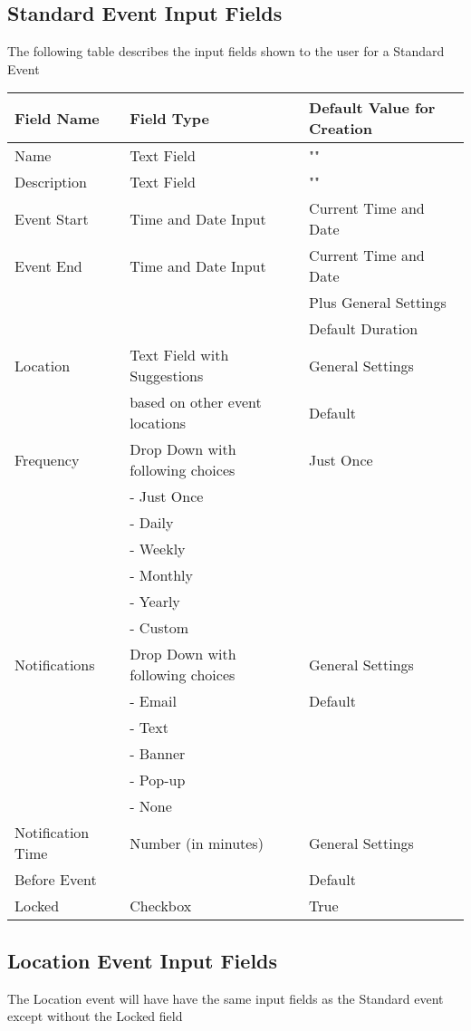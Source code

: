 \documentclass{scrreprt}
\begin{document}
\subsection{Standard Event Input Fields}
The following table describes the input fields shown to the user for a Standard Event
\begin{center}
\begin{longtable}{ | p{3cm} | p{8cm} | p{4cm} | }
\hline
\textbf{Field Name} & \textbf{Field Type} & \textbf{Default Value for Creation} \\
\hline
Name & Text Field & "" \\
\hline
Description & Text Field & "" \\
\hline
Event Start & Time and Date Input & Current Time and Date \\
\hline
Event End & Time and Date Input & Current Time and Date \\
& & Plus General Settings \\
& & Default Duration \\
\hline
Location & Text Field with Suggestions & General Settings \\
& based on other event locations & Default \\
\hline
Frequency & Drop Down with following choices & Just Once \\
& - Just Once & \\
& - Daily & \\
& - Weekly & \\
& - Monthly & \\
& - Yearly & \\
& - Custom & \\
\hline
Notifications & Drop Down with following choices & General Settings\\
& - Email & Default\\
& - Text & \\
& - Banner & \\
& - Pop-up & \\
& - None & \\
\hline
Notification Time & Number (in minutes) & General Settings \\
Before Event & & Default \\
\hline
Locked & Checkbox & True \\
\hline
\end{longtable}
\end{center}

\subsection{Location Event Input Fields}
The Location event will have have the same input fields as the Standard event except without the Locked field
\end{document}
